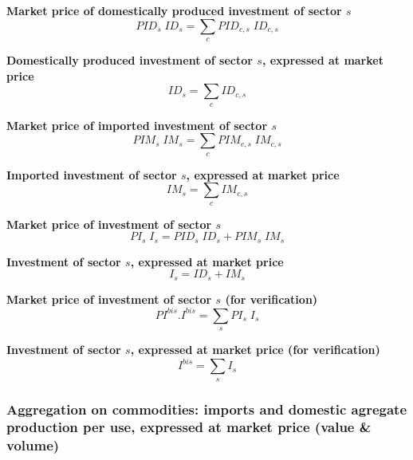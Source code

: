 \documentclass[12pt]{article}
\numberwithin{equation}{section}
\begin{document}
\noindent\textbf{Market price of domestically produced investment of sector $s$} \\
\begin{dmath}
PID_{s} \; ID_{s} = \sum_{c} PID_{c, s} \; ID_{c, s}
\end{dmath}

\noindent\textbf{Domestically produced investment of sector $s$, expressed at market price} \\
\begin{dmath}
ID_{s} = \sum_{c} ID_{c, s}
\end{dmath}

\noindent\textbf{Market price of imported investment of sector $s$} \\
\begin{dmath}
PIM_{s} \; IM_{s} = \sum_{c} PIM_{c, s} \; IM_{c, s}
\end{dmath}

\noindent\textbf{Imported investment of sector $s$, expressed at market price} \\
\begin{dmath}
IM_{s} = \sum_{c} IM_{c, s}
\end{dmath}

\noindent\textbf{Market price of investment of sector $s$} \\
\begin{dmath}
PI_{s} \; I_{s} = PID_{s} \; ID_{s} + PIM_{s} \; IM_{s}
\end{dmath}

\noindent\textbf{Investment of sector $s$, expressed at market price} \\
\begin{dmath}
I_{s} = ID_{s} + IM_{s}
\end{dmath}

\noindent\textbf{Market price of investment of sector $s$ (for verification)} \\
\begin{dmath}
PI^{bis} . I^{bis} = \sum_{s} PI_{s} \; I_{s}
\end{dmath}

\noindent\textbf{Investment of sector $s$, expressed at market price (for verification)} \\
\begin{dmath}
I^{bis} = \sum_{s} I_{s}
\end{dmath}



\subsubsection{Aggregation on commodities: imports and domestic agregate production per use, expressed at market price (value \& volume)}
\end{document}
